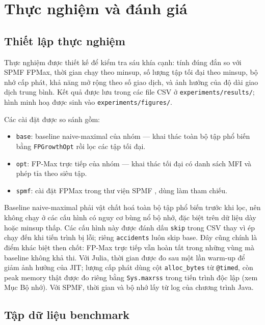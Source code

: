 \section{Thực nghiệm và đánh giá}
\label{sec:evaluation}

\subsection{Thiết lập thực nghiệm}

Thực nghiệm được thiết kế để kiểm tra sáu khía cạnh: tính đúng đắn so với SPMF FPMax, thời gian chạy theo minsup, số lượng tập tối đại theo minsup, bộ nhớ cấp phát, khả năng mở rộng theo số giao dịch, và ảnh hưởng của độ dài giao dịch trung bình. Kết quả được lưu trong các file CSV ở \texttt{experiments/results/}; hình minh hoạ được sinh vào \texttt{experiments/figures/}.

Các cài đặt được so sánh gồm:

\begin{itemize}
    \item \texttt{base}: baseline naive-maximal của nhóm --- khai thác toàn bộ tập phổ biến bằng \texttt{FPGrowthOpt} rồi lọc các tập tối đại.
    \item \texttt{opt}: FP-Max trực tiếp của nhóm --- khai thác tối đại có danh sách MFI và phép tỉa theo siêu tập.
    \item \texttt{spmf}: cài đặt FPMax trong thư viện SPMF \cite{FournierViger2014SPMF}, dùng làm tham chiếu.
\end{itemize}

Baseline naive-maximal phải vật chất hoá toàn bộ tập phổ biến trước khi lọc, nên không chạy ở các cấu hình có nguy cơ bùng nổ bộ nhớ, đặc biệt trên dữ liệu dày hoặc minsup thấp. Các cấu hình này được đánh dấu \texttt{skip} trong CSV thay vì ép chạy đến khi tiến trình bị lỗi; riêng \texttt{accidents} luôn skip base. Đây cũng chính là điểm khác biệt then chốt: FP-Max trực tiếp vẫn hoàn tất trong những vùng mà baseline không khả thi. Với Julia, thời gian được đo sau một lần warm-up để giảm ảnh hưởng của JIT; lượng cấp phát dùng cột \texttt{alloc\_bytes} từ \texttt{@timed}, còn peak memory thật được đo riêng bằng \texttt{Sys.maxrss} trong tiến trình độc lập (xem Mục Bộ nhớ). Với SPMF, thời gian và bộ nhớ lấy từ log của chương trình Java.

\subsection{Tập dữ liệu benchmark}


